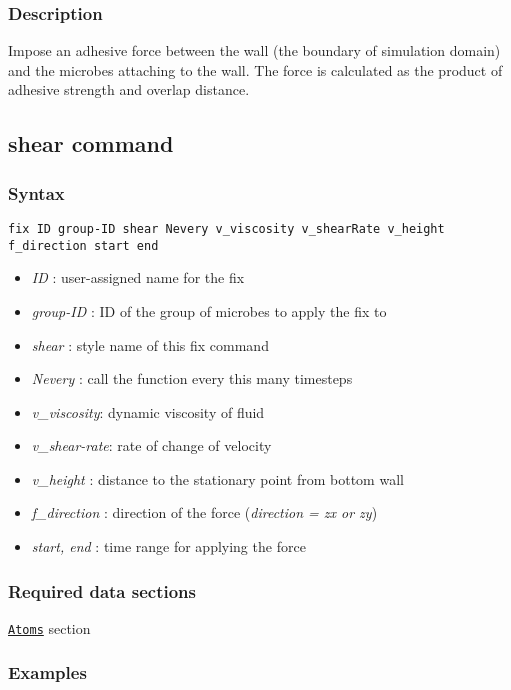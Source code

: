 \documentclass[11pt,a4paper,openright]{article}
\begin{document}
\subsubsection*{Description}

Impose an adhesive force between the wall (the boundary of simulation domain) 
and the microbes attaching to the wall. 
The force is calculated as the product of adhesive strength and overlap distance.

\newpage
\subsection{shear command}
\label{shear}
\subsubsection*{Syntax}
\begin{Verbatim}[frame=single]
fix ID group-ID shear Nevery v_viscosity v_shearRate v_height 
f_direction start end
\end{Verbatim}

\begin{itemize}  [nosep]
\item
	{\it ID }: user-assigned name for the fix
\item
	{\it group-ID }: ID of the group of microbes to apply the fix to
\item
	{\it shear }: style name of this fix command
\item
	{\it Nevery }: call the function every this many timesteps
\item
	{\it v\_viscosity}:  dynamic viscosity of fluid
\item
	{\it v\_shear-rate}: rate of change of velocity
\item
	{\it v\_height }: distance to the stationary point from bottom wall 
\item
	{\it f\_direction }: direction of the force ({\it direction = zx or zy})
\item
	{\it start, end }: time range for applying the force

\end{itemize}

\subsubsection*{Required data sections} 
\hyperref[satom]{\tt Atoms} section


\subsubsection*{Examples} 
\end{document}
